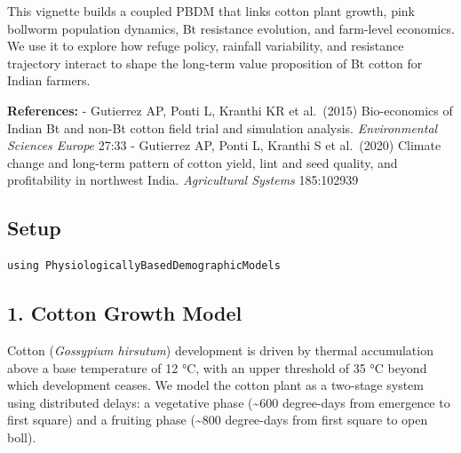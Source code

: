 This vignette builds a coupled PBDM that links cotton plant growth, pink bollworm population dynamics, Bt resistance evolution, and farm-level economics. We use it to explore how refuge policy, rainfall variability, and resistance trajectory interact to shape the long-term value proposition of Bt cotton for Indian farmers.



\textbf{References:} - Gutierrez AP, Ponti L, Kranthi KR et al.~(2015) Bio-economics of Indian Bt and non-Bt cotton field trial and simulation analysis. \emph{Environmental Sciences Europe} 27:33 - Gutierrez AP, Ponti L, Kranthi S et al.~(2020) Climate change and long-term pattern of cotton yield, lint and seed quality, and profitability in northwest India. \emph{Agricultural Systems} 185:102939



\subsection{Setup}



\label{3527608310570692752}{}



\begin{verbatim}
using PhysiologicallyBasedDemographicModels
\end{verbatim}



\subsection{1. Cotton Growth Model}



\label{14302157484959340209}{}


Cotton (\emph{Gossypium hirsutum}) development is driven by thermal accumulation above a base temperature of 12 °C, with an upper threshold of 35 °C beyond which development ceases. We model the cotton plant as a two-stage system using distributed delays: a vegetative phase ({\textasciitilde}600 degree-days from emergence to first square) and a fruiting phase ({\textasciitilde}800 degree-days from first square to open boll).




